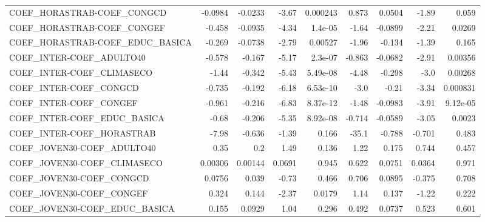 \begin{tabular}{lrrrrrrrr}
COEF\_HORASTRAB-COEF\_CONGCD            &     -0.0984 &      -0.0233 &   -3.67 & 0.000243 &      0.873 &      0.0504 &        -1.89 &         0.059 \\
COEF\_HORASTRAB-COEF\_CONGEF            &      -0.458 &      -0.0935 &   -4.34 &  1.4e-05 &      -1.64 &     -0.0899 &        -2.21 &        0.0269 \\
COEF\_HORASTRAB-COEF\_EDUC\_BASICA       &      -0.269 &      -0.0738 &   -2.79 &  0.00527 &      -1.96 &      -0.134 &        -1.39 &         0.165 \\
COEF\_INTER-COEF\_ADULTO40              &      -0.578 &       -0.167 &   -5.17 &  2.3e-07 &     -0.863 &     -0.0682 &        -2.91 &       0.00356 \\
COEF\_INTER-COEF\_CLIMASECO             &       -1.44 &       -0.342 &   -5.43 & 5.49e-08 &      -4.48 &      -0.298 &         -3.0 &       0.00268 \\
COEF\_INTER-COEF\_CONGCD                &      -0.735 &       -0.192 &   -6.18 & 6.53e-10 &       -3.0 &       -0.21 &        -3.34 &      0.000831 \\
COEF\_INTER-COEF\_CONGEF                &      -0.961 &       -0.216 &   -6.83 & 8.37e-12 &      -1.48 &     -0.0983 &        -3.91 &      9.12e-05 \\
COEF\_INTER-COEF\_EDUC\_BASICA           &       -0.68 &       -0.206 &   -5.35 & 8.92e-08 &     -0.714 &     -0.0589 &        -3.05 &        0.0023 \\
COEF\_INTER-COEF\_HORASTRAB             &       -7.98 &       -0.636 &   -1.39 &    0.166 &      -35.1 &      -0.788 &       -0.701 &         0.483 \\
COEF\_JOVEN30-COEF\_ADULTO40            &        0.35 &          0.2 &    1.49 &    0.136 &       1.22 &       0.175 &        0.744 &         0.457 \\
COEF\_JOVEN30-COEF\_CLIMASECO           &     0.00306 &      0.00144 &  0.0691 &    0.945 &      0.622 &      0.0751 &       0.0364 &         0.971 \\
COEF\_JOVEN30-COEF\_CONGCD              &      0.0756 &        0.039 &   -0.73 &    0.466 &      0.706 &      0.0895 &       -0.375 &         0.708 \\
COEF\_JOVEN30-COEF\_CONGEF              &       0.324 &        0.144 &   -2.37 &   0.0179 &       1.14 &       0.137 &        -1.22 &         0.222 \\
COEF\_JOVEN30-COEF\_EDUC\_BASICA         &       0.155 &       0.0929 &    1.04 &    0.296 &      0.492 &      0.0737 &        0.523 &         0.601 \\

\end{tabular}
